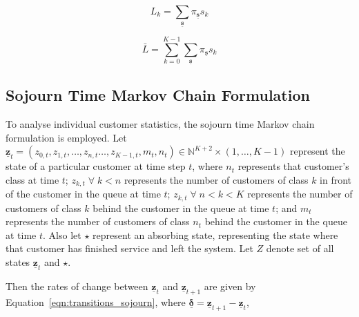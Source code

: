 \documentclass{article}
\begin{document}
\begin{equation}\label{eqn:mean_custs_k}
L_k = \sum_{\underline{\mathbf{s}}} \pi_{\underline{\mathbf{s}}} s_k
\end{equation}

\begin{equation}\label{eqn:mean_custs_overall}
\bar{L} = \sum_{k = 0}^{K - 1} \sum_{\underline{\mathbf{s}}} \pi_{\underline{\mathbf{s}}} s_k
\end{equation}



\subsection{Sojourn Time Markov Chain Formulation}\label{sec:sojourn_formulation}
To analyse individual customer statistics, the sojourn time Markov chain
formulation is employed. Let
$\underline{\mathbf{z}}_t = (z_{0,t}, z_{1,t}, \dots, z_{n,t} \dots, z_{K-1,t}, m_t, n_t) \in \mathbb{N}^{K+2} \times (1, \dots, K - 1)$
represent the state of a particular customer at time step $t$, where $n_t$
represents that customer's class at time $t$; $z_{k,t} \; \forall \; k < n$
represents the number of customers of class $k$ in front of the customer in the
queue at time $t$; $z_{k,t} \; \forall \; n < k < K$ represents the number of
customers of class $k$ behind the customer in the queue at time $t$; and $m_t$
represents the number of customers of class $n_t$ behind the customer in the
queue at time $t$.
Also let $\star$ represent an absorbing state, representing the state where that
customer has finished service and left the system.
Let $Z$ denote set of all states $\underline{\mathbf{z}}_t$ and $\star$. 


Then the rates of change between $\underline{\mathbf{z}}_t$ and
$\underline{\mathbf{z}}_{t+1}$ are given by Equation~\ref{eqn:transitions_sojourn},
where $\underline{\mathbf{\delta}} = \underline{\mathbf{z}}_{t+1} - \underline{\mathbf{z}}_t$,
\end{document}
